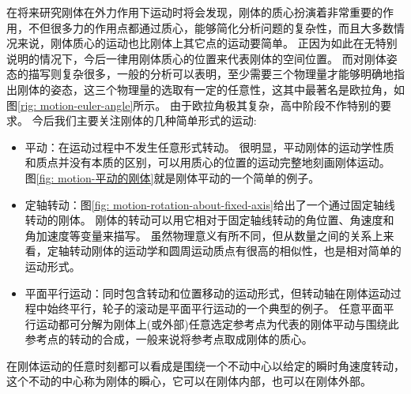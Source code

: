 在将来研究刚体在外力作用下运动时将会发现，刚体的质心扮演着非常重要的作用，不但很多力的作用点都通过质心，能够简化分析问题的复杂性，而且大多数情况来说，刚体质心的运动也比刚体上其它点的运动要简单。
正因为如此在无特别说明的情况下，今后一律用刚体质心的位置来代表刚体的空间位置。
而对刚体姿态的描写则复杂很多，一般的分析可以表明，至少需要三个物理量才能够明确地指出刚体的姿态，这三个物理量的选取有一定的任意性，这其中最著名是{\heiti 欧拉角}，如图\ref{rig: motion-euler-angle}所示。
由于欧拉角极其复杂，高中阶段不作特别的要求。
今后我们主要关注刚体的几种简单形式的运动:
\begin{itemize}
\item
平动：在运动过程中不发生任意形式转动。
很明显，平动刚体的运动学性质和质点并没有本质的区别，可以用质心的位置的运动完整地刻画刚体运动。
图\ref{fig: motion-平动的刚体}就是刚体平动的一个简单的例子。
\item
定轴转动：图\ref{fig: motion-rotation-about-fixed-axis}给出了一个通过固定轴线转动的刚体。
刚体的转动可以用它相对于固定轴线转动的角位置、角速度和角加速度等变量来描写。
虽然物理意义有所不同，但从数量之间的关系上来看，定轴转动刚体的运动学和圆周运动质点有很高的相似性，也是相对简单的运动形式。
\item
平面平行运动：同时包含转动和位置移动的运动形式，但转动轴在刚体运动过程中始终平行，轮子的滚动是平面平行运动的一个典型的例子。
任意平面平行运动都可分解为刚体上(或外部)任意选定参考点为代表的刚体平动与围绕此参考点的转动的合成，一般来说将参考点取成刚体的质心。
\end{itemize}
在刚体运动的任意时刻都可以看成是围绕一个不动中心以给定的瞬时角速度转动，这个不动的中心称为刚体的{\heiti 瞬心}，它可以在刚体内部，也可以在刚体外部。



